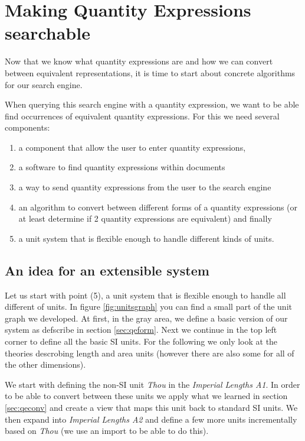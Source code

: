 \section{Making Quantity Expressions searchable}
Now that we know what quantity expressions are and how we can convert between equivalent representations, it is time to start about concrete algorithms for our search engine.

When querying this search engine with a quantity expression, we want to be able find occurrences of equivalent quantity expressions. For this we need several components:
\begin{enumerate}
  \item a component that allow the user to enter quantity expressions,
  \item a software to find quantity expressions within documents
  \item a way to send quantity expressions from the user to the search engine
  \item an algorithm to convert between different forms of a quantity expressions (or at least determine if 2 quantity expressions are equivalent) and finally
  \item a unit system that is flexible enough to handle different kinds of units.
\end{enumerate}

\subsection{An idea for an extensible system}
\label{sec:meq_model}

Let us start with point (5), a unit system that is flexible enough to handle all different of units. In figure \ref{fig:unitsgraph} you can find a small part of the unit graph we developed. At first, in the gray area, we define a basic version of our system as defscribe in section \ref{sec:qeform}. Next we continue in the top left corner to define all the basic SI units. For the following we only look at the theories descrobing length and area units (however there are also some for all of the other dimensions).



We start with defining the non-SI unit \textit{Thou} in the \textit{Imperial Lengths A1}. In order to be able to convert between these units we apply what we learned in section \ref{sec:qeconv} and create a view that maps this unit back to standard SI units. We then expand into \textit{Imperial Lengths A2} and define a few more units incrementally based on \textit{Thou} (we use an import to be able to do this).

